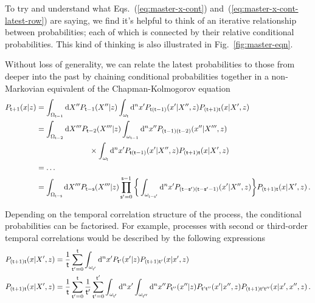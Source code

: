To try and understand what Eqs.~(\ref{eq:master-x-cont}) and~(\ref{eq:master-x-cont-latest-row}) are saying, we find it's helpful to think of an iterative relationship between probabilities; each of which is connected by their relative conditional probabilities. This kind of thinking is also illustrated in Fig.~\ref{fig:master-eqn}.

Without loss of generality, we can relate the latest probabilities to those from deeper into the past by chaining conditional probabilities together in a non-Markovian equivalent of the Chapman-Kolmogorov equation
\begin{align}
P_{{\sf t}+1}(x\vert z) &= \int_{\Omega_{{\sf t}-1}}{\rm d}X''P_{{\sf t}-1}(X''\vert z)\int_{\omega_{{\sf t}}}{\rm d}^nx' P_{{\sf t}({\sf t}-1)}(x'\vert X'',z)P_{({\sf t}+1){\sf t}}(x\vert X',z) \nonumber \\
&= \int_{\Omega_{{\sf t}-2}}{\rm d}X'''P_{{\sf t}-2}(X'''\vert z)\int_{\omega_{{\sf t}-1}}{\rm d}^nx''P_{({\sf t}-1)({\sf t}-2)}(x''\vert X''',z) \nonumber \\
&\qquad \qquad \qquad \quad \times\int_{\omega_{{\sf t}}}{\rm d}^nx' P_{{\sf t}({\sf t}-1)}(x'\vert X'',z)P_{({\sf t}+1){\sf t}}(x\vert X',z) \nonumber \\
&= \dots \nonumber \\
&= \int_{\Omega_{{\sf t}-{\sf s}}}{\rm d}X'''P_{{\sf t}-{\sf s}}(X'''\vert z)\prod_{{\sf s}'=0}^{{\sf s}-1} \bigg\lbrace \int_{\omega_{{\sf t}-{\sf s}'}}{\rm d}^nx' P_{({\sf t}-{\sf s}')({\sf t}-{\sf s}'-1)}(x'\vert X'',z) \bigg\rbrace P_{({\sf t}+1){\sf t}}(x\vert X',z) \,.
\end{align}

Depending on the temporal correlation structure of the process, the conditional probabilities can be factorised. For example, processes with second or third-order temporal correlations would be described by the following expressions
\begin{align}
P_{({\sf t}+1){\sf t}}(x\vert X',z) &= \frac{1}{{\sf t}}\sum_{{\sf t}'=0}^{{\sf t}}\int_{\omega_{{\sf t}'}}{\rm d}^nx' P_{{\sf t}'}(x'\vert z)P_{({\sf t}+1){\sf t}'}(x\vert x',z) \\
P_{({\sf t}+1){\sf t}}(x\vert X',z) &= \frac{1}{{\sf t}}\sum_{{\sf t}'=0}^{{\sf t}}\frac{1}{{\sf t}'}\sum_{{\sf t}'=0}^{{\sf t}'}\int_{\omega_{{\sf t}'}}{\rm d}^nx'\int_{\omega_{{\sf t}''}}{\rm d}^nx'' P_{{\sf t}''}(x''\vert z) P_{{\sf t}'{\sf t}''}(x'\vert x'',z)P_{({\sf t}+1){\sf t}'{\sf t}''}(x\vert x',x'',z) \,.
\end{align}

